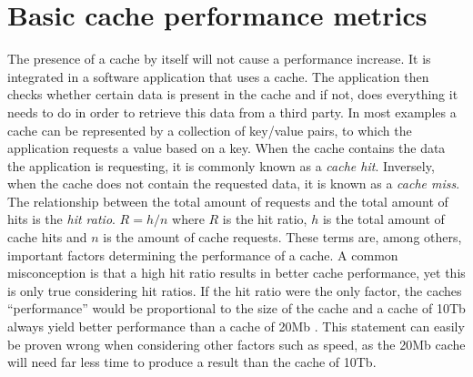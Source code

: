\documentclass[pdftex,a4paper,12pt,twoside]{report}
\begin{document}
\section{Basic cache performance metrics}
The presence of a cache by itself will not cause a performance increase. It is integrated in a software application that uses a cache. The application then checks whether certain data is present in the cache and if not, does everything it needs to do in order to retrieve this data from a third party. In most examples a cache can be represented by a collection of key/value pairs, to which the application requests a value based on a key. When the cache contains the data the application is requesting, it is commonly known as a \emph{cache hit}. Inversely, when the cache does not contain the requested data, it is known as a \emph{cache miss}. The relationship between the total amount of requests and the total amount of hits is the \emph{hit ratio}.
$R=h/n$ where $R$ is the hit ratio, $h$ is the total amount of cache hits and $n$ is the amount of cache requests.
These terms are, among others, important factors determining the performance of a cache. A common misconception is that a high hit ratio results in better cache performance, yet this is only true considering hit ratios. If the hit ratio were the only factor, the caches ``performance'' would be proportional to the size of the cache and a cache of 10Tb always yield better performance than a cache of 20Mb \citep{wulf1995hitting}. This statement can easily be proven wrong when considering other factors such as speed, as the 20Mb cache will need far less time to produce a result than the cache of 10Tb.
\end{document}

